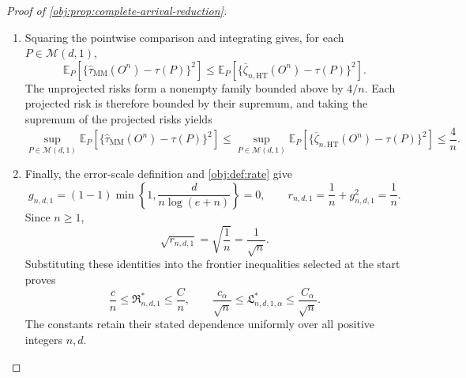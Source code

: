 \begin{proof}[Proof of \cref{obj:prop:complete-arrival-reduction}]
\begin{enumerate}
\item Squaring the pointwise comparison and integrating gives, for each \(P\in\mathcal M(d,1)\),
\[
\mathbb E_P\!\left[
\{\widehat\tau_{\mathrm{MM}}(O^n)-\tau(P)\}^{2}
\right]
\le
\mathbb E_P\!\left[
\{\overline\zeta_{n,\mathrm{HT}}(O^n)-\tau(P)\}^{2}
\right].
\]
The unprojected risks form a nonempty family bounded above by \(4/n\). Each projected risk is therefore bounded by their supremum, and taking the supremum of the projected risks yields
\[
\sup_{P\in\mathcal M(d,1)}
\mathbb E_P\!\left[
\{\widehat\tau_{\mathrm{MM}}(O^n)-\tau(P)\}^{2}
\right]
\le
\sup_{P\in\mathcal M(d,1)}
\mathbb E_P\!\left[
\{\overline\zeta_{n,\mathrm{HT}}(O^n)-\tau(P)\}^{2}
\right]
\le\frac4n.
\]

\item Finally, the error-scale definition and \cref{obj:def:rate} give
\[
g_{n,d,1}
=(1-1)\min\left\{1,\frac{d}{n\log(e+n)}\right\}=0,
\qquad
r_{n,d,1}=\frac1n+g_{n,d,1}^{2}=\frac1n.
\]
Since \(n\ge1\),
\[
\sqrt{r_{n,d,1}}
=\sqrt{\frac1n}
=\frac1{\sqrt n}.
\]
Substituting these identities into the frontier inequalities selected at the start proves
\[
\frac cn\le\mathfrak R^*_{n,d,1}\le\frac Cn,
\qquad
\frac{c_\alpha}{\sqrt n}
\le\mathfrak L^*_{n,d,1,\alpha}
\le\frac{C_\alpha}{\sqrt n}.
\]
The constants retain their stated dependence uniformly over all positive integers \(n,d\).
\end{enumerate}
\end{proof}

